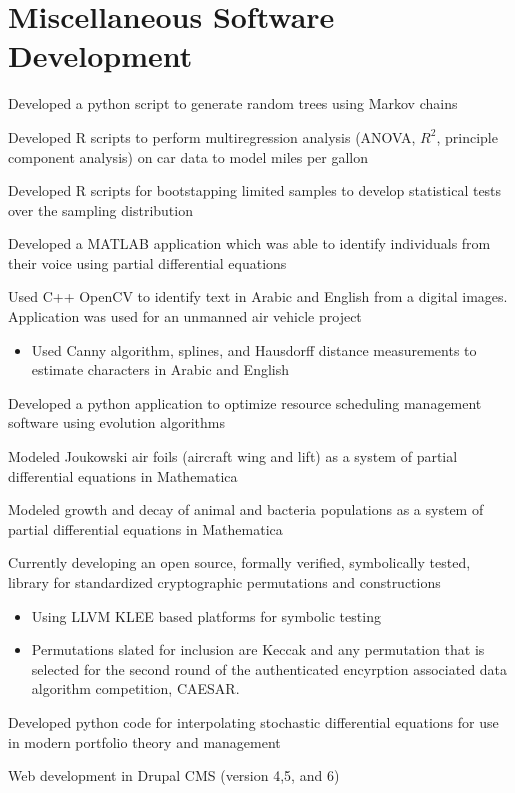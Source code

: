 \documentclass[letterpaper]{clinton-resume}
\begin{document}
\begin{minipage}[t]{0.66\textwidth}
\section{Miscellaneous Software Development}
\vspace{\topsep}
\begin{tightitemize}
\item Developed a python script to generate random trees using Markov chains
\item Developed R scripts to perform multiregression analysis (ANOVA, $R^2$, principle component analysis)  on car data to model miles per gallon
\item Developed R scripts for bootstapping limited samples to develop statistical tests over the sampling distribution
\item Developed a MATLAB application which was able to identify individuals from their voice using partial differential equations
\item Used C++ OpenCV to identify text in Arabic and English from a digital images.  Application was used for an unmanned air vehicle project
\begin{itemize}
\item Used Canny algorithm, splines, and Hausdorff distance measurements to estimate characters in Arabic and English
\end{itemize}
\item Developed a python application to optimize resource scheduling management software using evolution algorithms
\item Modeled Joukowski air foils (aircraft wing and lift) as a system of partial differential equations in Mathematica
\item Modeled growth and decay of animal and bacteria populations as a system of partial differential equations in Mathematica
\end{tightitemize}
\vspace{\topsep}
\begin{tightitemize}
\item Currently developing an open source, formally verified, symbolically tested, library for standardized cryptographic permutations and constructions
	\begin{itemize}
	\item Using LLVM KLEE based platforms for symbolic testing
	\item Permutations slated for inclusion are Keccak and any permutation that is selected for the second round of the authenticated encyrption associated data algorithm competition, CAESAR.
	\end{itemize}
\item Developed python code for interpolating stochastic differential equations for use in modern portfolio theory and management
\item Web development in Drupal CMS (version 4,5, and 6)
\end{tightitemize}
\end{minipage}
\end{document}
